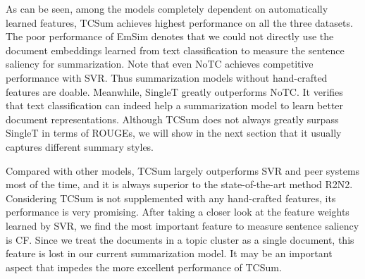 \documentclass[letterpaper]{article}
\begin{document}
As can be seen, among the models completely dependent on automatically learned features, TCSum achieves highest performance on all the three datasets.
The poor performance of EmSim denotes that we could not directly use the document embeddings learned from text classification to measure the sentence saliency for summarization.
Note that even NoTC achieves competitive performance with SVR.
Thus summarization models without hand-crafted features are doable.
Meanwhile, SingleT greatly outperforms NoTC.
It verifies that text classification can indeed help a summarization model to learn better document representations.
Although TCSum does not always greatly surpass SingleT in terms of ROUGEs, we will show in the next section that it usually captures different summary styles.

Compared with other models, TCSum largely outperforms SVR and peer systems most of the time, and it is always superior to the state-of-the-art method R2N2.
Considering TCSum is not supplemented with any hand-crafted features, its performance is very promising.
After taking a closer look at the feature weights learned by SVR, we find the most important feature to measure sentence saliency is CF.
Since we treat the documents in a topic cluster as a single document, this feature is lost in our current summarization model.
It may be an important aspect that impedes the more excellent performance of TCSum.
\end{document}
